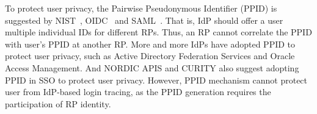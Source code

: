 

To protect user privacy, the Pairwise Pseudonymous Identifier (PPID) is suggested by NIST~\cite{NIST2017draft}, OIDC~\cite{OpenIDConnect} and SAML~\cite{SAMLIdentifier}.
That is, IdP should offer a user multiple individual IDs for different RPs. 
Thus, an RP cannot  correlate the  PPID  with user's PPID at another RP. 
More and more IdPs have adopted PPID to protect user privacy, such as Active Directory Federation Services and Oracle Access Management.
And NORDIC APIS and CURITY also suggest adopting PPID in SSO to protect user privacy.
However, PPID mechanism cannot protect user from IdP-based login tracing, as the PPID generation requires the participation of RP identity.


